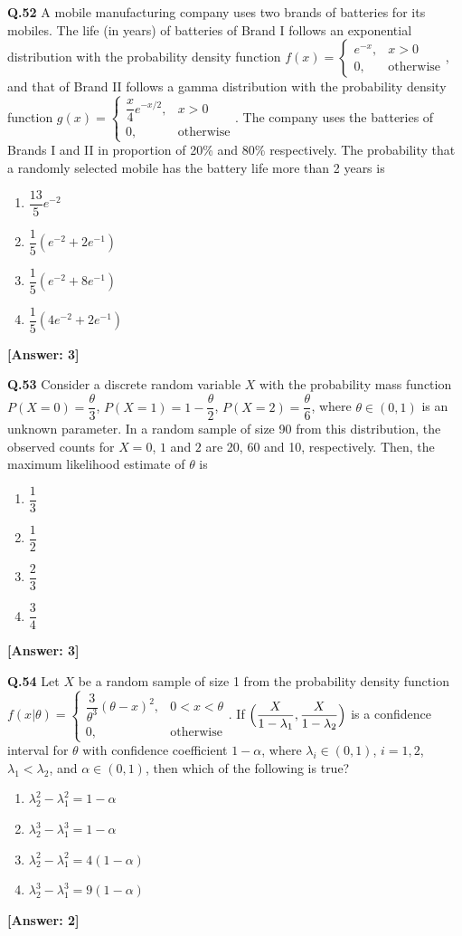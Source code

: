 \documentclass[12pt,a4paper]{article}
\newcommand{\ans}[1]{\quad\textcolor{anscolor}{\textbf{[Answer: #1]}}}
\begin{document}
\textbf{Q.52} A mobile manufacturing company uses two brands of batteries for its mobiles. The life (in years) of batteries of Brand I follows an exponential distribution with the probability density function $f(x)=\begin{cases}e^{-x},&x>0\\0,&\text{otherwise}\end{cases}$, and that of Brand II follows a gamma distribution with the probability density function $g(x)=\begin{cases}\dfrac{x}{4}e^{-x/2},&x>0\\0,&\text{otherwise}\end{cases}$. The company uses the batteries of Brands I and II in proportion of 20\% and 80\% respectively. The probability that a randomly selected mobile has the battery life more than 2 years is
\begin{enumerate}[label=\arabic*.]
\item $\dfrac{13}{5}e^{-2}$
\item $\dfrac{1}{5}(e^{-2}+2e^{-1})$
\item $\dfrac{1}{5}(e^{-2}+8e^{-1})$
\item $\dfrac{1}{5}(4e^{-2}+2e^{-1})$
\end{enumerate}\ans{3}

\textbf{Q.53} Consider a discrete random variable $X$ with the probability mass function $P(X=0)=\dfrac{\theta}{3}$, $P(X=1)=1-\dfrac{\theta}{2}$, $P(X=2)=\dfrac{\theta}{6}$, where $\theta\in(0,1)$ is an unknown parameter. In a random sample of size 90 from this distribution, the observed counts for $X=0$, $1$ and $2$ are 20, 60 and 10, respectively. Then, the maximum likelihood estimate of $\theta$ is
\begin{enumerate}[label=\arabic*.]
\item $\dfrac{1}{3}$ \item $\dfrac{1}{2}$ \item $\dfrac{2}{3}$ \item $\dfrac{3}{4}$
\end{enumerate}\ans{3}

\textbf{Q.54} Let $X$ be a random sample of size 1 from the probability density function $f(x|\theta)=\begin{cases}\dfrac{3}{\theta^3}(\theta-x)^2,&0<x<\theta\\0,&\text{otherwise}\end{cases}$. If $\Bigl(\dfrac{X}{1-\lambda_1},\dfrac{X}{1-\lambda_2}\Bigr)$ is a confidence interval for $\theta$ with confidence coefficient $1-\alpha$, where $\lambda_i\in(0,1)$, $i=1,2$, $\lambda_1<\lambda_2$, and $\alpha\in(0,1)$, then which of the following is true?
\begin{enumerate}[label=\arabic*.]
\item $\lambda_2^2-\lambda_1^2=1-\alpha$
\item $\lambda_2^3-\lambda_1^3=1-\alpha$
\item $\lambda_2^2-\lambda_1^2=4(1-\alpha)$
\item $\lambda_2^3-\lambda_1^3=9(1-\alpha)$
\end{enumerate}\ans{2}
\end{document}
